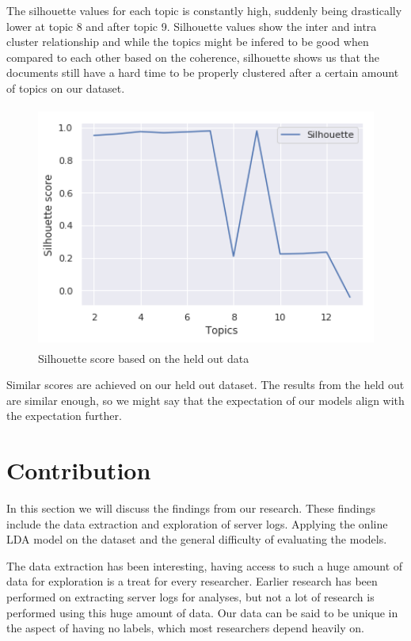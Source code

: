 The silhouette values for each topic is constantly high, suddenly being drastically lower at topic 8 and after topic 9. Silhouette values show the inter and intra cluster relationship and while the topics might be infered to be good when compared to each other based on the coherence, silhouette shows us that the documents still have a hard time to be properly clustered after a certain amount of topics on our dataset.

\begin{figure}[h]
    \centering
    \includegraphics[width=15cm, height=8cm]{figures/silhouette_values_topics_held_out.png}
    \caption{Silhouette score based on the held out data}
    \label{fig:Held out}
\end{figure}

Similar scores are achieved on our held out dataset. The results from the held out are similar enough, so we might say that the expectation of our models align with the expectation further. 

\FloatBarrier
\section{Contribution}\label{results:contribution}
In this section we will discuss the findings from our research. These findings include the data extraction and exploration of server logs. Applying the online LDA model on the dataset and the general difficulty of evaluating the models. 

The data extraction has been interesting, having access to such a huge amount of data for exploration is a treat for every researcher. Earlier research has been performed on extracting server logs for analyses, but not a lot of research is performed using this huge amount of data. Our data can be said to be unique in the aspect of having no labels, which most researchers depend heavily on.

